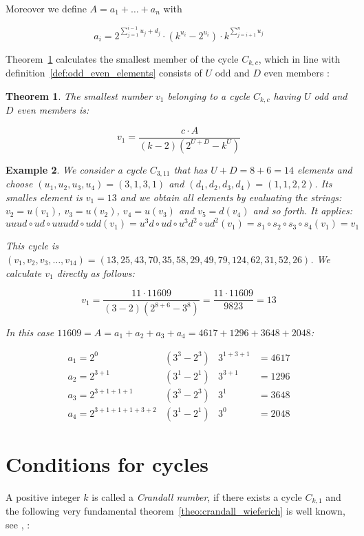 \documentclass[12pt]{amsart}
\newtheorem{theorem}{Theorem}[section]
\newtheorem{example}[theorem]{Example}
\theoremstyle{definition}
\begin{document}
\par\noindent
Moreover we define $A=a_1+\ldots+a_n$ with

\[
a_i=2^{\sum_{j=1}^{i-1}u_j+d_j}\cdot\left(k^{u_i}-2^{u_i}\right)\cdot k^{\sum_{j=i+1}^{n}u_j}
\]

\par\medskip\noindent
Theorem~\ref{theo:v0} calculates the smallest member of the cycle $C_{k,c}$, which in line with definition~\ref{def:odd_even_elements} consists of $U$ odd and $D$ even members \cite{Ref_Gupta_2020}:

\begin{theorem}
\label{theo:v0}
The smallest number $v_1$ belonging to a cycle $C_{k,c}$ having $U$ odd and $D$ even members is:

\[
v_1=\frac{c\cdot A}{(k-2)(2^{U+D}-k^U)}
\]
\end{theorem}

\par\medskip
\begin{example}
We consider a cycle $C_{3,11}$ that has $U+D=8+6=14$ elements and choose $(u_1,u_2,u_3,u_4)=(3,1,3,1)$ and $(d_1,d_2,d_3,d_4)=(1,1,2,2)$. Its smalles element is $v_1=13$ and we obtain all elements by evaluating the strings: $v_2=u(v_1)$, $v_3=u(v_2)$, $v_4=u(v_3)$ and $v_5=d(v_4)$ and so forth. It applies:
\[
uuud\circ ud\circ uuudd\circ udd(v_1)=u^3d\circ ud\circ u^3d^2\circ ud^2(v_1)=s_1\circ s_2\circ s_3\circ s_4(v_1)=v_1
\]

\par\noindent
This cycle is $(v_1,v_2,v_3,\ldots,v_{14})=(13,25,43,70,35,58,29,49,79,124,62,31,52,26)$. We calculate $v_1$ directly as follows:

\[
v_1=\frac{11\cdot 11609}{(3-2)(2^{8+6}-3^8)}=\frac{11\cdot11609}{9823}=13
\]

\par\noindent
In this case $11609=A=a_1+a_2+a_3+a_4=4617+1296+3648+2048$:

\[
\begin{array}{llll}
a_1=2^{0}&(3^3-2^3)&3^{1+3+1}&=4617\\
a_2=2^{3+1}&(3^1-2^1)&3^{3+1}&=1296\\
a_3=2^{3+1+1+1}&(3^3-2^3)&3^{1}&=3648\\
a_4=2^{3+1+1+1+3+2}&(3^1-2^1)&3^{0}&=2048
\end{array}
\]
\end{example}

\section{Conditions for cycles}
A positive integer $k$ is called a \textit{Crandall number}, if there exists a cycle $C_{k,1}$ and the following very fundamental theorem~\ref{theo:crandall_wieferich} is well known, see \cite{Ref_Crandall_1978}, \cite{Ref_Franco_Pomerance_1995}:
\end{document}
